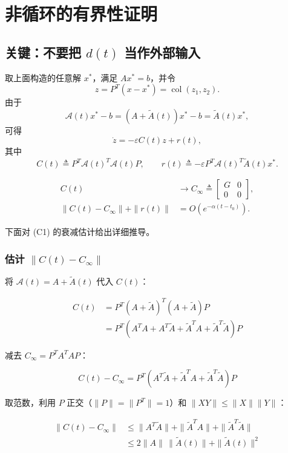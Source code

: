 \documentclass[UTF8,fontset=fandol]{ctexart}
\newcommand{\col}{\operatorname{col}}
\begin{document}
\section{非循环的有界性证明}

\subsection{关键：不要把 $d(t)$ 当作外部输入}

取上面构造的任意解 $x^*$，满足 $Ax^*=b$，并令
\[
z=P^{T}(x-x^*)
=\col(z_1,z_2).
\]
由于
\[
\mathcal{A}(t)x^*-b
=(A+\tilde{A}(t))x^*-b
=\tilde{A}(t)x^*,
\]
可得
\begin{equation}
\dot{z}=-\varepsilon C(t)z+r(t),
\tag{C}
\end{equation}
其中
\[
C(t)\triangleq P^{T}\mathcal{A}(t)^{T}\mathcal{A}(t)P,
\qquad
r(t)\triangleq-\varepsilon P^{T}\mathcal{A}(t)^{T}\tilde{A}(t)x^*.
\]

\begin{equation}
\begin{aligned}
C(t)&\to
C_\infty\triangleq
\begin{bmatrix}
G&0\\
0&0
\end{bmatrix},\\
\|C(t)-C_\infty\|+\|r(t)\|
&=O(e^{-\alpha(t-t_0)}).
\end{aligned}
\tag{C1}
\end{equation}

下面对 (C1) 的衰减估计给出详细推导。

\subsubsection*{估计 $\|C(t)-C_\infty\|$}

将 $\mathcal{A}(t)=A+\tilde{A}(t)$ 代入 $C(t)$：

\[
\begin{aligned}
C(t) &= P^T(A+\tilde{A})^T(A+\tilde{A})P \\
&= P^T(A^TA + A^T\tilde{A} + \tilde{A}^TA + \tilde{A}^T\tilde{A})P
\end{aligned}
\]

减去 $C_\infty = P^TA^TAP$：

\[
C(t)-C_\infty = P^T(A^T\tilde{A} + \tilde{A}^TA + \tilde{A}^T\tilde{A})P
\]

取范数，利用 $P$ 正交（$\|P\|=\|P^T\|=1$）和 $\|XY\|\leq\|X\|\|Y\|$：

\[
\begin{aligned}
\|C(t)-C_\infty\|
&\leq \|A^T\tilde{A}\| + \|\tilde{A}^TA\| + \|\tilde{A}^T\tilde{A}\| \\
&\leq 2\|A\|\,\|\tilde{A}(t)\| + \|\tilde{A}(t)\|^2
\end{aligned}
\]
\end{document}
